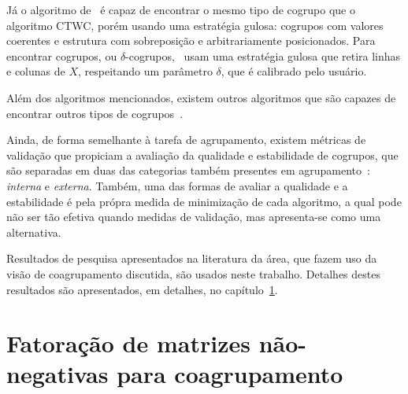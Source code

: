 \documentclass[
    12pt,                %
    oneside,            %
    a4paper,            %
    english,            %
    brazil                %
    ]{abntex2ppgsi}
\begin{document}
Já o algoritmo de~ é capaz de encontrar o mesmo tipo de cogrupo que o algoritmo CTWC, porém usando uma estratégia gulosa: cogrupos com valores coerentes e estrutura com sobreposição e arbitrariamente posicionados.
Para encontrar cogrupos, ou $\delta$-cogrupos,~ usam uma estratégia gulosa que retira linhas e colunas de $X$, respeitando um parâmetro $\delta$, que é calibrado pelo usuário.

Além dos algoritmos mencionados, existem outros algoritmos que são capazes de encontrar outros tipos de cogrupos~\cite{Franca20102,Yang2013,Hochreiter2010,Cabanes2012}.

Ainda, de forma semelhante à tarefa de agrupamento, existem métricas de validação que propiciam a avaliação da qualidade e estabilidade de cogrupos, que são separadas em duas das categorias também presentes em agrupamento~\cite{Hochreiter2010}: \textit{interna} e \textit{externa}.
Também, uma das formas de avaliar a qualidade e a estabilidade é pela própra medida de minimização de cada algoritmo, a qual pode não ser tão efetiva quando medidas de validação, mas apresenta-se como uma alternativa.

Resultados de pesquisa apresentados na literatura da área, que fazem uso da visão de coagrupamento discutida, são usados neste trabalho.
Detalhes destes resultados são apresentados, em detalhes, no capítulo~\ref{ch:fatoracao}.

\chapter{Fatoração de matrizes não-negativas para coagrupamento}
\label{ch:fatoracao}
\end{document}
